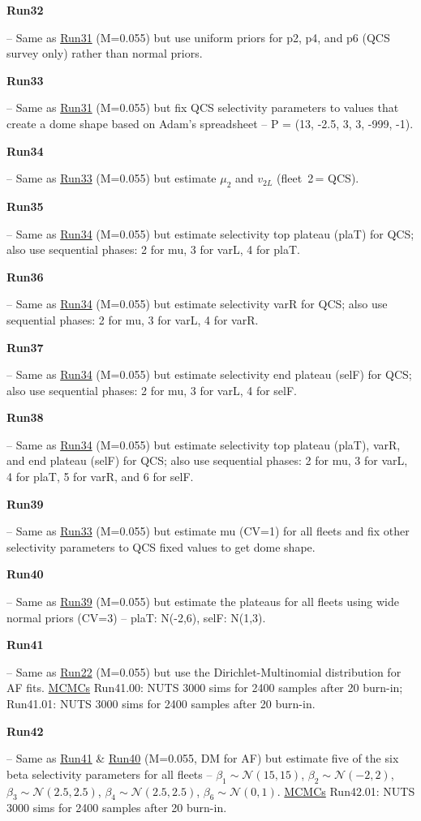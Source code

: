 \hypertarget{R32}{\textbf{Run32}} -- Same as \hyperlink{R31}{Run31} (M=0.055) but use uniform priors for p2, p4, and p6 (QCS survey only) rather than normal priors.

\hypertarget{R33}{\textbf{Run33}} -- Same as \hyperlink{R31}{Run31} (M=0.055) but fix QCS selectivity parameters to values that create a dome shape based on Adam's spreadsheet -- P = (13, -2.5, 3, 3, -999, -1).

\hypertarget{R34}{\textbf{Run34}} -- Same as \hyperlink{R33}{Run33} (M=0.055) but estimate $\mu_{2}$ and $v_{2L}$ (fleet~2\,= QCS).

\hypertarget{R35}{\textbf{Run35}} -- Same as \hyperlink{R34}{Run34} (M=0.055) but estimate selectivity top plateau (plaT) for QCS; also use sequential phases: 2 for mu, 3 for varL, 4 for plaT.

\hypertarget{R36}{\textbf{Run36}} -- Same as \hyperlink{R34}{Run34} (M=0.055) but estimate selectivity varR for QCS; also use sequential phases: 2 for mu, 3 for varL, 4 for varR.

\hypertarget{R37}{\textbf{Run37}} -- Same as \hyperlink{R34}{Run34} (M=0.055) but estimate selectivity end plateau (selF) for QCS; also use sequential phases: 2 for mu, 3 for varL, 4 for selF.

\hypertarget{R38}{\textbf{Run38}} -- Same as \hyperlink{R34}{Run34} (M=0.055) but estimate selectivity top plateau (plaT), varR, and end plateau (selF) for QCS; also use sequential phases: 2 for mu, 3 for varL, 4 for plaT, 5 for varR, and 6 for selF.

\hypertarget{R39}{\textbf{Run39}} -- Same as \hyperlink{R33}{Run33} (M=0.055) but estimate mu (CV=1) for all fleets and fix other selectivity parameters to QCS fixed values to get dome shape.

\hypertarget{R40}{\textbf{Run40}} -- Same as \hyperlink{R39}{Run39} (M=0.055) but estimate the plateaus for all fleets using wide normal priors (CV=3) -- plaT: N(-2,6), selF: N(1,3).

\hypertarget{R41}{\textbf{Run41}} -- Same as \hyperlink{R22}{Run22} (M=0.055) but use the Dirichlet-Multinomial distribution for AF fits. \underline{MCMCs} Run41.00: NUTS 3000 sims for 2400 samples after 20\pc{} burn-in; Run41.01: NUTS 3000 sims for 2400 samples after 20\pc{} burn-in.

\hypertarget{R42}{\textbf{Run42}} -- Same as \hyperlink{R41}{Run41} \& \hyperlink{R40}{Run40} (M=0.055, DM for AF) but estimate five of the six beta selectivity parameters for all fleets -- $\beta_1 \sim \mathcal{N}(15,15)$, $\beta_2 \sim \mathcal{N}(-2,2)$, $\beta_3 \sim \mathcal{N}(2.5,2.5)$, $\beta_4 \sim \mathcal{N}(2.5,2.5)$, $\beta_6 \sim \mathcal{N}(0,1)$. \underline{MCMCs} Run42.01: NUTS 3000 sims for 2400 samples after 20\pc{} burn-in.

